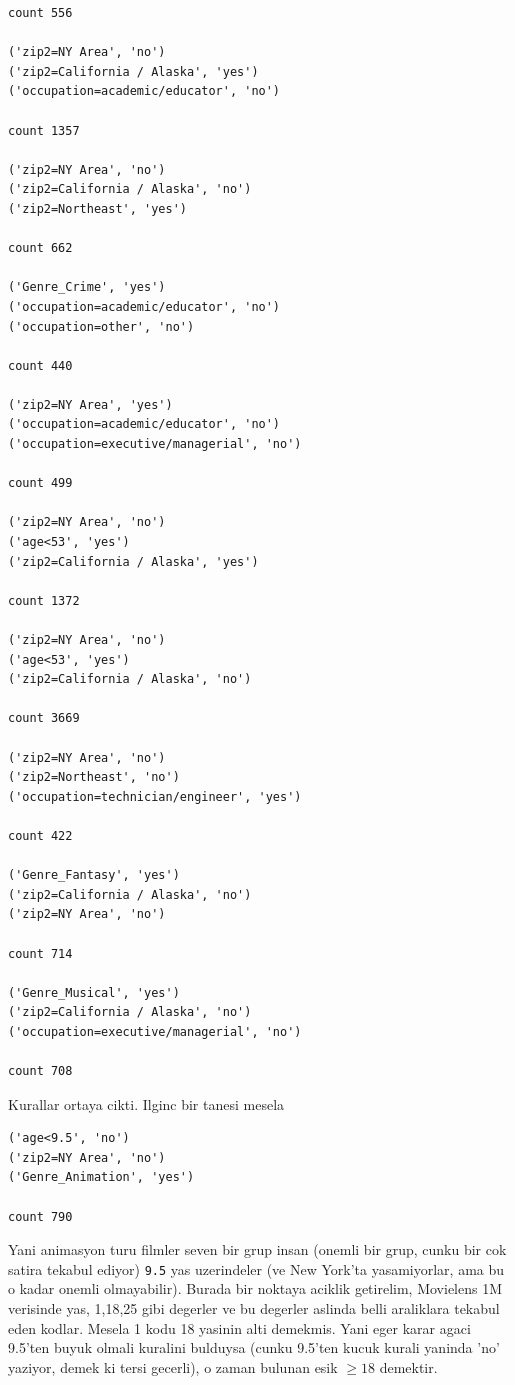 \documentclass[12pt,fleqn]{article}\usepackage{../common}
\begin{document}
\begin{verbatim}
count 556

('zip2=NY Area', 'no')
('zip2=California / Alaska', 'yes')
('occupation=academic/educator', 'no')

count 1357

('zip2=NY Area', 'no')
('zip2=California / Alaska', 'no')
('zip2=Northeast', 'yes')

count 662

('Genre_Crime', 'yes')
('occupation=academic/educator', 'no')
('occupation=other', 'no')

count 440

('zip2=NY Area', 'yes')
('occupation=academic/educator', 'no')
('occupation=executive/managerial', 'no')

count 499

('zip2=NY Area', 'no')
('age<53', 'yes')
('zip2=California / Alaska', 'yes')

count 1372

('zip2=NY Area', 'no')
('age<53', 'yes')
('zip2=California / Alaska', 'no')

count 3669

('zip2=NY Area', 'no')
('zip2=Northeast', 'no')
('occupation=technician/engineer', 'yes')

count 422

('Genre_Fantasy', 'yes')
('zip2=California / Alaska', 'no')
('zip2=NY Area', 'no')

count 714

('Genre_Musical', 'yes')
('zip2=California / Alaska', 'no')
('occupation=executive/managerial', 'no')

count 708
\end{verbatim}

Kurallar ortaya cikti. Ilginc bir tanesi mesela 

\begin{verbatim}
('age<9.5', 'no')
('zip2=NY Area', 'no')
('Genre_Animation', 'yes')

count 790
\end{verbatim}

Yani animasyon turu filmler seven bir grup insan (onemli bir grup, cunku
bir cok satira tekabul ediyor) \verb!9.5! yas uzerindeler (ve New York'ta
yasamiyorlar, ama bu o kadar onemli olmayabilir). Burada bir noktaya
aciklik getirelim, Movielens 1M verisinde yas, 1,18,25 gibi degerler ve bu
degerler aslinda belli araliklara tekabul eden kodlar. Mesela 1 kodu 18
yasinin alti demekmis. Yani eger karar agaci 9.5'ten buyuk olmali kuralini
bulduysa (cunku 9.5'ten kucuk kurali yaninda 'no' yaziyor, demek ki tersi
gecerli), o zaman bulunan esik $\ge 18$ demektir.
\end{document}
